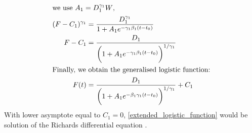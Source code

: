 \documentclass[fleqn,10pt]{wlscirep_SI}
\begin{document}
\begin{align}
%
\\ \intertext{we use $A_{1} = D_{1}^{\gamma_1} W$,} 
%
(F-C_1)^{\gamma_1} &= \frac{D_{1}^{\gamma_1}}{1 + A_{1} e^{- {\gamma_1} \beta_{1} (t-t_0)}} \nonumber
\\
F-C_1 &= \frac{D_{1}}{\biggl( 1 + A_{1} e^{- {\gamma_1} \beta_{1} (t-t_0)}\biggr)^{1/{\gamma_1}}} \nonumber
%
\\ \intertext{Finally, we obtain the generalised logistic function:} 
%
F(t) &= \frac{D_{1}}{\biggl(1+A_{1}e^{-\beta_{1}{\gamma_1}(t-t_0)}\biggr)^{1/{\gamma_1}}} + C_{1}
\label{extended_logistic_function}
\end{align}
With lower asymptote equal to $C_1=0$, \cref{extended_logistic_function} would be solution of the Richards differential equation \cite{Nelder,Richards,Wang2012,Turner}.







\end{document}
